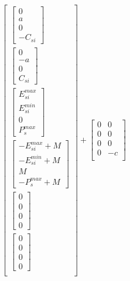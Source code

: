 \documentclass[11pt]{article} %
\begin{document}
\begin{align}
    \begin{bmatrix}
        \begin{bmatrix}
            0\\
            a\\
            0\\
            -C_{si}
        \end{bmatrix}\\
        \begin{bmatrix}
            0\\
            -a\\
            0\\
            C_{si}
        \end{bmatrix}\\
        \begin{bmatrix}
            E_{si}^{max}\\
            E_{si}^{min}\\
            0\\
            P_{s}^{max}
        \end{bmatrix}\\
        \begin{bmatrix}
            -E_{si}^{max} + M\\
            -E_{si}^{min} + M\\
            M\\
            -P_{s}^{max} + M
        \end{bmatrix}\\
        \begin{bmatrix}
            0\\
            0\\
            0\\
            0
        \end{bmatrix}\\
        \begin{bmatrix}
            0\\
            0\\
            0\\
            0
        \end{bmatrix}\\
    \end{bmatrix} +
    \begin{bmatrix}
        0 & 0\\
        0 & 0\\
        0 & 0\\
        0 & -c\\

\end{bmatrix}
\end{align}
\end{document}
